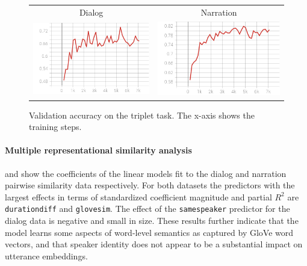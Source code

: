 \begin{figure}
  \centering
  \begin{tabular}{cc}
    Dialog & Narration \\
    \includegraphics[scale=0.3]{val_acc3.png}  & \includegraphics[scale=0.3]{valnarr_acc3.png}\\
  \end{tabular}
  \caption{Validation accuracy on the triplet task. The x-axis shows
    the training steps.}
  \label{fig:triplet}
\end{figure}

\paragraph{Multiple representational similarity analysis}
 and  show the coefficients
of the linear models fit to the dialog and narration pairwise
similarity data respectively. For both datasets the predictors with
the largest effects in terms of standardized coefficient magnitude and
partial $R^2$ are {\tt durationdiff} and {\tt glovesim}. The effect of
the {\tt samespeaker} predictor for the dialog data is negative and
small in size.  These results further indicate that the model learns
some aspects of word-level semantics as captured by GloVe word
vectors, and that speaker identity does not appear to be a substantial
impact on utterance embeddings.

